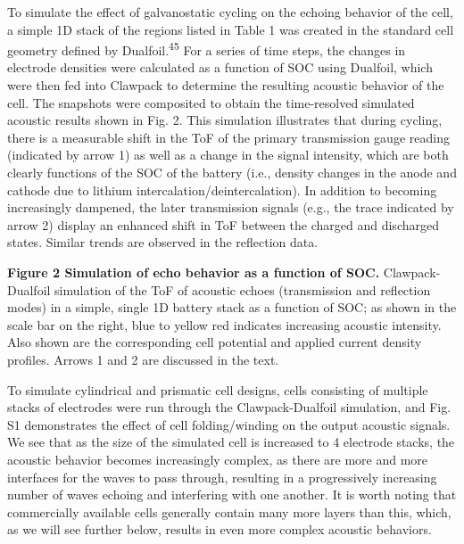 \documentclass[]{article}
\begin{document}
{ }To simulate the effect of galvanostatic cycling on the echoing
behavior of the cell, a simple 1D stack of the regions listed in Table 1
was created in the standard cell geometry defined by
Dualfoil.\textsuperscript{45} For a series of time steps, the changes in
electrode densities were calculated as a function of SOC using Dualfoil,
which were then fed into Clawpack to determine the resulting acoustic
behavior of the cell. The snapshots were composited to obtain the
time-resolved simulated acoustic results shown in Fig. 2. This
simulation illustrates that during cycling, there is a measurable shift
in the ToF of the primary transmission gauge reading (indicated by arrow
1) as well as a change in the signal intensity, which are both clearly
functions of the SOC of the battery (i.e., density changes in the anode
and cathode due to lithium intercalation/deintercalation). In addition
to becoming increasingly dampened, the later transmission signals (e.g.,
the trace indicated by arrow 2) display an enhanced shift in ToF between
the charged and discharged states. Similar trends are observed in the
reflection data.{~}

\textbf{Figure 2 \textbar{} Simulation of echo behavior as a function of
SOC.} Clawpack-Dualfoil simulation of the ToF of acoustic echoes
(transmission and reflection modes) in a simple, single 1D battery stack
as a function of SOC; as shown in the scale bar on the right, blue to
yellow red indicates increasing acoustic intensity. Also shown are the
corresponding cell potential and applied current density profiles.
Arrows 1 and 2 are discussed in the text.

{ }To simulate cylindrical and prismatic cell designs, cells consisting
of multiple stacks of electrodes were run through the Clawpack-Dualfoil
simulation, and Fig. S1 demonstrates the effect of cell folding/winding
on the output acoustic signals. We see that as the size of the simulated
cell is increased to 4 electrode stacks, the acoustic behavior becomes
increasingly complex, as there are more and more interfaces for the
waves to pass through, resulting in a progressively increasing number of
waves echoing and interfering with one another. It is worth noting that
commercially available cells generally contain many more layers than
this, which, as we will see further below, results in even more complex
acoustic behaviors. ~
\end{document}
